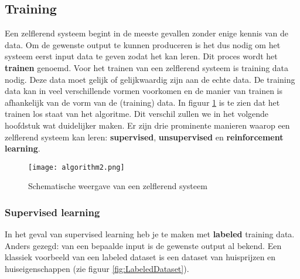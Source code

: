 \subsection{Training}
Een zelflerend systeem begint in de meeste gevallen zonder enige kennis van de data. Om de gewenste output te kunnen produceren is het dus nodig om het systeem eerst input data te geven zodat het kan leren. Dit proces wordt het \textbf{trainen} genoemd. Voor het trainen van een zelflerend systeem is training data nodig. Deze data moet gelijk of gelijkwaardig zijn aan de echte data. De training data kan in veel verschillende vormen voorkomen en de manier van trainen is afhankelijk van de vorm van de (training) data. In figuur \ref{fig:algorithm2}  is te zien dat het trainen los staat van het algoritme. Dit verschil zullen we in het volgende hoofdstuk wat duidelijker maken. 
Er zijn drie prominente manieren waarop een zelflerend systeem kan leren: \textbf{supervised}, \textbf{unsupervised} en \textbf{reinforcement learning}.

\begin{figure}[H]
  \centering
    \texttt{[image: algorithm2.png]}
  \caption{Schematische weergave van een zelflerend systeem}
  \label{fig:algorithm2}
\end{figure}

\subsubsection{Supervised learning}
In het geval van supervised learning heb je te maken met \textbf{labeled} training data. Anders gezegd: van een bepaalde input is de gewenste output al bekend. Een klassiek voorbeeld van een labeled dataset is een dataset van huisprijzen en huiseigenschappen (zie figuur \ref{fig:LabeledDataset}).

